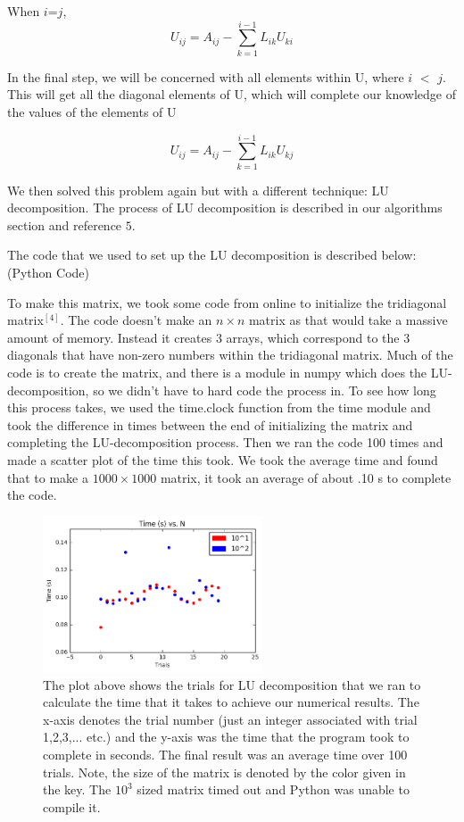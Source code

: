 \documentclass{article}
\begin{document}
When $i$=$j$,
\begin{equation*}
U_{ij}=A_{ij} -\sum_{k=1}^{i-1} L_{ik} U_{ki}
\end{equation*}

In the final step, we will be concerned with all elements within U, where $i$ $<$ $j$. This will get all the diagonal elements of U, which will complete our knowledge of the values of the elements of U

\begin{equation*}
U_{ij} = A_{ij}- \sum_{k=1}^{i-1} L_{ik} U_{kj}
\end{equation*}

We then solved this problem again but with a different technique: LU decomposition. The process of LU decomposition is described in our algorithms section and reference ${5}$. 

The code that we used to set up the LU decomposition is described below: (Python Code)



To make this matrix, we took some code from online to initialize the tridiagonal matrix$^{[4]}$. The code doesn't make an $n\times n$ matrix as that would take a massive amount of memory. Instead it creates 3 arrays, which correspond to the 3 diagonals that have non-zero numbers within the tridiagonal matrix. Much of the code is to create the matrix, and there is a module in numpy which does the LU-decomposition, so we didn't have to hard code the process in. To see how long this process takes, we used the time.clock function from the time module and took the difference in times between the end of initializing the matrix and completing the LU-decomposition process. Then we ran the code 100 times and made a scatter plot of the time this took. We took the average time and found that to make a $1000\times1000$ matrix, it took an average of about .10 s to complete the code.

\begin{figure}[h!]
	\centering
	\includegraphics[width = 6.5cm]{LU_N_comparison_graph.png}
	\caption{The plot above shows the trials for LU decomposition that we ran to calculate the time that it takes to achieve our numerical results. The x-axis denotes the trial number (just an integer associated with trial 1,2,3,... etc.) and the y-axis was the time that the program took to complete in seconds. The final result was an average time over 100 trials. Note, the size of the matrix is denoted by the color given in the key. The $10^{3}$ sized matrix timed out and Python was unable to compile it.}
\end{figure}
\end{document}

